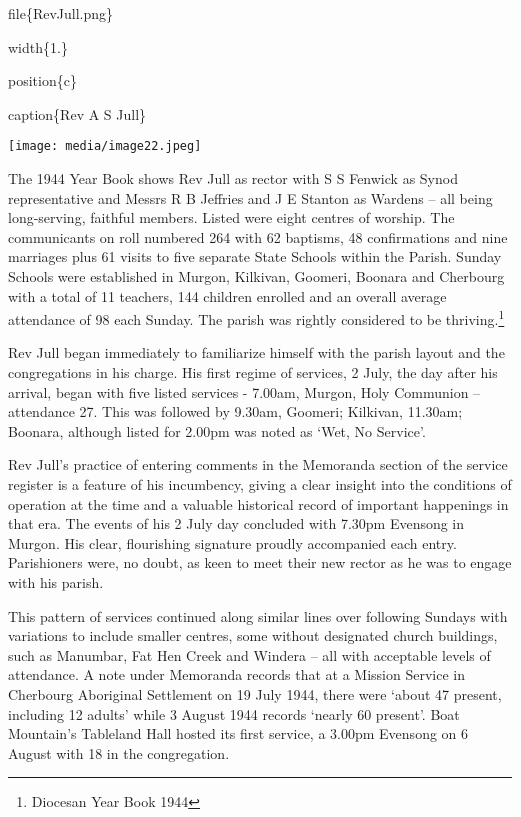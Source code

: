 file\{RevJull.png\}

width\{1.\}

position\{c\}

caption\{Rev A S Jull\}

\texttt{[image: media/image22.jpeg]}

The 1944 Year Book shows Rev Jull as rector with S S Fenwick as Synod representative and Messrs R B Jeffries and J E Stanton as Wardens -- all being long-serving, faithful members. Listed were eight centres of worship. The communicants on roll numbered 264 with 62 baptisms, 48 confirmations and nine marriages plus 61 visits to five separate State Schools within the Parish. Sunday Schools were established in Murgon, Kilkivan, Goomeri, Boonara and Cherbourg with a total of 11 teachers, 144 children enrolled and an overall average attendance of 98 each Sunday. The parish was rightly considered to be thriving.\footnote{Diocesan Year Book 1944}

Rev Jull began immediately to familiarize himself with the parish layout and the congregations in his charge. His first regime of services, 2 July, the day after his arrival, began with five listed services - 7.00am, Murgon, Holy Communion -- attendance 27. This was followed by 9.30am, Goomeri; Kilkivan, 11.30am; Boonara, although listed for 2.00pm was noted as `Wet, No Service'.

Rev Jull's practice of entering comments in the Memoranda section of the service register is a feature of his incumbency, giving a clear insight into the conditions of operation at the time and a valuable historical record of important happenings in that era. The events of his 2 July day concluded with 7.30pm Evensong in Murgon. His clear, flourishing signature proudly accompanied each entry. Parishioners were, no doubt, as keen to meet their new rector as he was to engage with his parish.

This pattern of services continued along similar lines over following Sundays with variations to include smaller centres, some without designated church buildings, such as Manumbar, Fat Hen Creek and Windera -- all with acceptable levels of attendance. A note under Memoranda records that at a Mission Service in Cherbourg Aboriginal Settlement on 19 July 1944, there were `about 47 present, including 12 adults' while 3 August 1944 records `nearly 60 present'. Boat Mountain's Tableland Hall hosted its first service, a 3.00pm Evensong on 6 August with 18 in the congregation.

